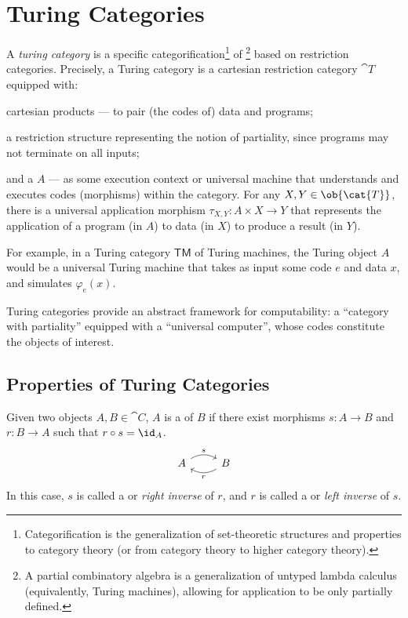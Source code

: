 \section{Turing Categories}

A \emph{turing category} is a specific categorification\footnote[1]{
  Categorification is the generalization of set-theoretic
  structures and properties to category theory
  (or from category theory to higher category theory).
}
of \footnote[2]{
  A partial combinatory algebra is a generalization
  of untyped lambda calculus (equivalently, Turing machines),
  allowing for application to be only partially defined.
}
based on restriction categories.
Precisely, a Turing category is a cartesian restriction category
$\cat{T}$ equipped with:
\begin{enumarabic}
  \item cartesian products --- to pair (the codes of) data and programs;
  \item a restriction structure representing the
    notion of partiality, since programs may not terminate on all inputs;
  \item and a  $A$ --– as some execution context
    or universal machine that understands and executes codes (morphisms)
    within the category.
    For any $X, Y \in \ob{\cat{T}}$,
    there is a universal application morphism
    $\tau_{X, Y} : A \times X \to Y$
    that represents the application of a program (in $A$) to data (in $X$)
    to produce a result (in $Y$).~\cite{TURING-CATEGORIES}
    \def \TM {\mathsf{TM}}
    \begin{remark}
      For example, in a Turing category $\TM$ of Turing machines,
      the Turing object $A$ would be a universal Turing machine
      that takes as input some code $e$ and data $x$,
      and simulates $\varphi_e(x)$.
    \end{remark}
\end{enumarabic}

Turing categories provide an abstract framework for computability:
a ``category with partiality'' equipped with a ``universal computer'',
whose codes constitute the objects of interest.
\cite{TURING-CATEGORIES}

\subsection{Properties of Turing Categories}

\begin{definition}
  Given two objects $A, B \in \cat{C}$, $A$ is a  of $B$
  if there exist morphisms $s : A \to B$ and $r : B \to A$ such that
  $r \circ s = \id_A$.
  \[
    \begin{tikzcd}
      A \arrow[r, "s", bend left] &B \arrow[l, "r", bend left]
    \end{tikzcd}
  \]
  In this case, $s$ is called a  or \emph{right inverse} of $r$,
  and $r$ is called a  or \emph{left inverse} of $s$.
  \cite{APPLICATIVE-STRUCTURES}
\end{definition}

